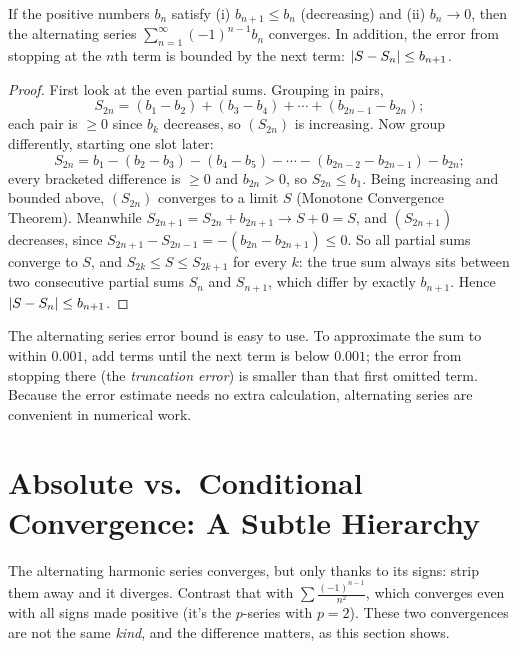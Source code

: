 \begin{theorem}
\label{ch29:thm-alternating}
If the positive numbers $b_n$ satisfy (i) $b_{n+1} \le b_n$ (decreasing) and (ii) $b_n \to 0$, then the alternating series $\sum_{n=1}^\infty (-1)^{n-1} b_n$ converges. In addition, the error from stopping at the $n$th term is bounded by the next term: $\lvert S - S_n\rvert \le b_{n+1}$.
\end{theorem}

\begin{proof}
First look at the even partial sums. Grouping in pairs,
\[
S_{2n} = (b_1 - b_2) + (b_3 - b_4) + \cdots + (b_{2n-1}-b_{2n});
\]
each pair is $\ge 0$ since $b_k$ decreases, so $(S_{2n})$ is increasing. Now group differently, starting one slot later:
\[
S_{2n} = b_1 - (b_2 - b_3) - (b_4 - b_5) - \cdots - (b_{2n-2} - b_{2n-1}) - b_{2n};
\]
every bracketed difference is $\ge 0$ and $b_{2n} > 0$, so $S_{2n} \le b_1$. Being increasing and bounded above, $(S_{2n})$ converges to a limit $S$ (Monotone Convergence Theorem). Meanwhile $S_{2n+1} = S_{2n} + b_{2n+1} \to S + 0 = S$, and $(S_{2n+1})$ decreases, since $S_{2n+1} - S_{2n-1} = -(b_{2n} - b_{2n+1}) \le 0$. So all partial sums converge to $S$, and $S_{2k} \le S \le S_{2k+1}$ for every $k$: the true sum always sits between two consecutive partial sums $S_n$ and $S_{n+1}$, which differ by exactly $b_{n+1}$. Hence $\lvert S - S_n\rvert \le b_{n+1}$.
\end{proof}

\begin{aestheticbox}
The alternating series error bound is easy to use. To approximate the sum to within $0.001$, add terms until the next term is below $0.001$; the error from stopping there (the \emph{truncation error}) is smaller than that first omitted term. Because the error estimate needs no extra calculation, alternating series are convenient in numerical work.
\end{aestheticbox}

\section{Absolute vs.\ Conditional Convergence: A Subtle Hierarchy}
\label{ch29:absolute}

The alternating harmonic series converges, but only thanks to its signs: strip them away and it diverges. Contrast that with $\sum \tfrac{(-1)^{n-1}}{n^2}$, which converges even with all signs made positive (it's the $p$-series with $p=2$). These two convergences are not the same \emph{kind}, and the difference matters, as this section shows.

